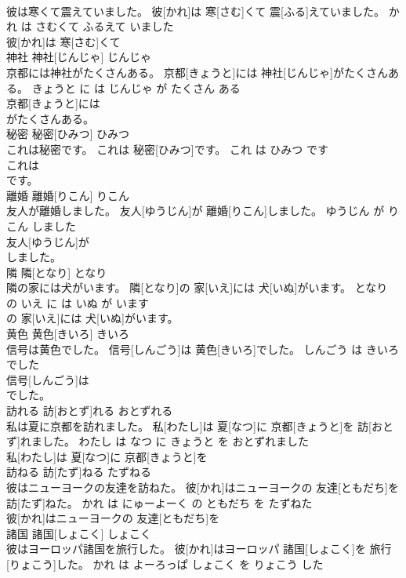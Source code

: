 \documentclass[8pt]{extreport}
\begin{document}
\begin{CJK}{UTF8}{min}
\\	彼は寒くて震えていました。	彼[かれ]は 寒[さむ]くて 震[ふる]えていました。	かれ は さむくて ふるえて いました	
\\	彼[かれ]は 寒[さむ]くて
\\	神社	神社[じんじゃ]	じんじゃ	
\\	京都には神社がたくさんある。	京都[きょうと]には 神社[じんじゃ]がたくさんある。	きょうと に は じんじゃ が たくさん ある	
\\	京都[きょうと]には
\\	がたくさんある。			
\\	秘密	秘密[ひみつ]	ひみつ	
\\	これは秘密です。	これは 秘密[ひみつ]です。	これ は ひみつ です	
\\	これは
\\	です。			
\\	離婚	離婚[りこん]	りこん	
\\	友人が離婚しました。	友人[ゆうじん]が 離婚[りこん]しました。	ゆうじん が りこん しました	
\\	友人[ゆうじん]が
\\	しました。			
\\	隣	隣[となり]	となり	
\\	隣の家には犬がいます。	隣[となり]の 家[いえ]には 犬[いぬ]がいます。	となり の いえ に は いぬ が います	
\\	の 家[いえ]には 犬[いぬ]がいます。			
\\	黄色	黄色[きいろ]	きいろ	
\\	信号は黄色でした。	信号[しんごう]は 黄色[きいろ]でした。	しんごう は きいろ でした	
\\	信号[しんごう]は
\\	でした。			
\\	訪れる	訪[おとず]れる	おとずれる	
\\	私は夏に京都を訪れました。	私[わたし]は 夏[なつ]に 京都[きょうと]を 訪[おとず]れました。	わたし は なつ に きょうと を おとずれました	
\\	私[わたし]は 夏[なつ]に 京都[きょうと]を
\\	訪ねる	訪[たず]ねる	たずねる	
\\	彼はニューヨークの友達を訪ねた。	彼[かれ]はニューヨークの 友達[ともだち]を 訪[たず]ねた。	かれ は にゅーよーく の ともだち を たずねた	
\\	彼[かれ]はニューヨークの 友達[ともだち]を
\\	諸国	諸国[しょこく]	しょこく	
\\	彼はヨーロッパ諸国を旅行した。	彼[かれ]はヨーロッパ 諸国[しょこく]を 旅行[りょこう]した。	かれ は よーろっぱ しょこく を りょこう した	

\end{CJK}
\end{document}
